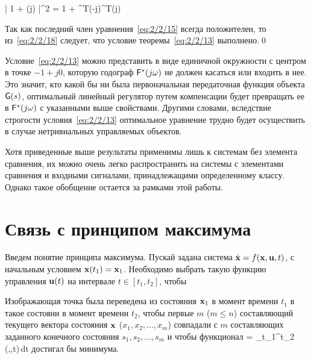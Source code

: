     \bigl| 1 + \funcT(j\omega) \bigr|^2 = 1 + ^T(-j\omega)^T\m{\Lambda}(j\omega) 
\eeq

Так как последний член уравнения~\vref{eq:2/2/15} всегда положителен, то из~\ref{eq:2/2/18} следует, что условие теоремы~\ref{eq:2/2/13} выполнено.\qed

Условие~\ref{eq:2/2/13} можно представить в виде единичной окружности с центром в точке $-1 + j0$, которую годограф $\mathsf{F}^{*}(j\omega)$ не должен касаться или входить в нее. Это значит, кто какой бы ни была первоначальная передаточная функция объекта $\mathsf{G}(s)$, оптимальный линейный регулятор путем компенсации будет превращать ее в $\mathsf{F}^{*}(j\omega)$ с указанными выше свойствами. Другими словами, вследствие строгости условия~\vref{eq:2/2/13} оптимальное уравнение трудно будет осуществить в случае нетривиальных управляемых объектов.

\br

Хотя приведенные выше результаты применимы лишь к системам без элемента сравнения, их можно очень легко распространить на системы с элементами сравнения и входными сигналами, принадлежащими определенному классу. Однако такое обобщение остается за рамками этой работы.



\section{Связь с принципом максимума}




Введем понятие принципа максимума. Пускай задана система $\dot{\mathbf{x}} = f(\mathbf{x}, \mathbf{u}, t)$, с начальным условием $\mathbf{x}(t_1) = \mathbf{x}_1$. Необходимо выбрать такую функцию управления $\mathbf{u}(t)$ на интервале $t \in [t_1, t_2]$, чтобы

\benum
    \item
        Изображающая точка была переведена из состояния $\mathbf{x}_1$ в момент времени $t_1$ в такое состояни в момент времени $t_2$, чтобы первые $m$ ($m \leqslant n$) составляющий текущего вектора состояния $\mathbf{x}$ ($x_1, x_2, \ldots, x_m$) совпадали с $m$ составляющих заданного конечного состояния $s_1, s_2, \ldots, s_m$ и чтобы функционал
            \funcF = \int\limits_{t_1}^{t_2} \funcL(,,t)\,dt
        \eeq
        достигал бы минимума.

